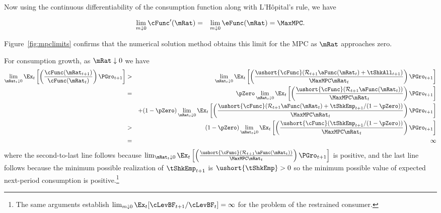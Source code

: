 \documentclass[titlepage]{\econtex}\providecommand{\texname}{BufferStockTheory}%
\begin{document}
{Now using the continuous differentiability of the consumption function
along with L'H\^opital's rule, we have
\begin{comment}
\begin{eqnarray*}
    \eFunc^{\prime}(\mRat) & = & \mRat^{-1} \cFunc^{\prime}(\mRat) - \mRat^{-2} \cFunc(\mRat)
\\ \mRat \eFunc^{\prime}(\mRat) & = & \cFunc^{\prime}(\mRat) - \cFunc(\mRat)/\mRat
\\ \cFunc^{\prime}(\mRat) & = & \eFunc(\mRat)+ \mRat \eFunc^{\prime}(\mRat)
\end{eqnarray*}
and since $0<\eFunc(\mRat)<1$ we have
\end{comment}
\begin{eqnarray}
  \lim_{m \downarrow 0} \cFunc^{\prime}(\mRat) & = & \lim_{m \downarrow 0}
  \eFunc(\mRat) = \MaxMPC. \nonumber
\end{eqnarray}

Figure~\ref{fig:mpclimits} confirms that the numerical solution method
obtains this limit for the MPC as $\mRat$ approaches zero.

For consumption growth, as $\mRat \downarrow 0$ we have
\begin{eqnarray*}
\lim_{\mRat_{t} \downarrow 0} \Ex_{t}\left[\left(\frac{\cFunc({\mRat}_{t+1})}{\cFunc(\mRat_t)}\right){\PGro}_{t+1}\right]
& > & \lim_{\mRat_{t} \downarrow 0} \Ex_{t}\left[\left(\frac{\ushort{\cFunc}({\mathcal{\mathcal{R}}}_{t+1}\aFunc(\mRat_{t})+{%
\tShkAll}_{t+1})}{\MaxMPC \mRat_{t}}\right){\PGro}_{t+1}\right]  \notag \\
& = & \phantom{+}\pZero \lim_{\mRat_{t} \downarrow 0} \Ex_{t}\left[\left(\frac{\ushort{\cFunc}({\mathcal{\mathcal{R}}}_{t+1}\aFunc(\mRat_{t}))}{\MaxMPC \mRat_{t}}\right){\PGro}_{t+1}\right] \\
& & + \pNotZero \lim_{\mRat_{t} \downarrow 0}  \Ex_{t}\left[\left(\frac{\ushort{\cFunc}({\mathcal{\mathcal{R}}}_{t+1}\aFunc(\mRat_{t})+
\tShkEmp_{t+1}/\pNotZero)}{\MaxMPC \mRat_{t}}\right){\PGro}_{t+1}\right]  \\\notag
& > & \pNotZero \lim_{\mRat_{t} \downarrow 0} \Ex_{t}\left[\left(\frac{\ushort{\cFunc}(
\tShkEmp_{t+1}/\pNotZero)}{\MaxMPC \mRat_{t}}\right){\PGro}_{t+1}\right] \\
& = & \infty \nonumber
\end{eqnarray*}
where the second-to-last line follows because  $\lim_{\mRat_{t} \downarrow 0} \Ex_{t}\left[\left(\frac{\ushort{\cFunc}({\mathcal{\mathcal{R}}}_{t+1}\aFunc(\mRat_{t}))}{\MaxMPC \mRat_{t}}\right){\PGro}_{t+1}\right]$ is positive, and the last line follows because the minimum possible realization of $\tShkEmp_{t+1}$ is $\ushort{\tShkEmp}>0$ so the minimum possible value of expected next-period consumption is positive.\footnote{
The same arguments establish $\lim_{m \downarrow 0} \Ex_{t}[\cLevBF_{t+1}/\cLevBF_{t}] = \infty$
for the problem of the restrained consumer.%
}

}
\end{document}
